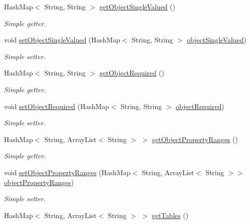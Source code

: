 \begin{DoxyCompactItemize}
HashMap$<$ String, String $>$ \hyperlink{class_data_base_1_1_tables_a5c052fa560c9cf209239d22bd277dfaa}{getObjectSingleValued} ()
\begin{DoxyCompactList}\small\item\em Simple getter. \end{DoxyCompactList}\item 
void \hyperlink{class_data_base_1_1_tables_a8e525dceed00c8db3710913f02dfc98e}{setObjectSingleValued} (HashMap$<$ String, String $>$ \hyperlink{class_data_base_1_1_tables_ae379376430f85d3c7cef16bf1a962ff1}{objectSingleValued})
\begin{DoxyCompactList}\small\item\em Simple setter. \end{DoxyCompactList}\item 
HashMap$<$ String, String $>$ \hyperlink{class_data_base_1_1_tables_a1e14c688b73c58acdd00e37fa03e9a65}{getObjectRequired} ()
\begin{DoxyCompactList}\small\item\em Simple getter. \end{DoxyCompactList}\item 
void \hyperlink{class_data_base_1_1_tables_ab25f6ae6e35aff6a3318da5128376036}{setObjectRequired} (HashMap$<$ String, String $>$ \hyperlink{class_data_base_1_1_tables_a11874c966b0f22fc88b7fb46cb3331ed}{objectRequired})
\begin{DoxyCompactList}\small\item\em Simple setter. \end{DoxyCompactList}\item 
HashMap$<$ String, ArrayList$<$ String $>$ $>$ \hyperlink{class_data_base_1_1_tables_aba5a86d237192b92c71f05fd9cb70573}{getObjectPropertyRanges} ()
\begin{DoxyCompactList}\small\item\em Simple getter. \end{DoxyCompactList}\item 
void \hyperlink{class_data_base_1_1_tables_abc4efc7ae4a231d68dcde9d9b5ab22f0}{setObjectPropertyRanges} (HashMap$<$ String, ArrayList$<$ String $>$$>$ \hyperlink{class_data_base_1_1_tables_af580afd6f42aac3503cecab2e615ef73}{objectPropertyRanges})
\begin{DoxyCompactList}\small\item\em Simple setter. \end{DoxyCompactList}\item 
HashMap$<$ String, ArrayList$<$ String $>$ $>$ \hyperlink{class_data_base_1_1_tables_abbcc329ed2c56e281f2ea3583c9978f2}{getTables} ()
$$
\end{DoxyCompactItemize}
